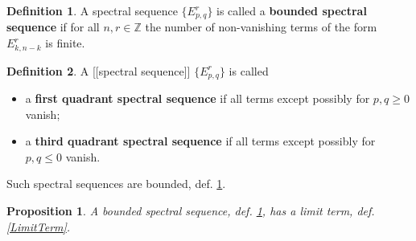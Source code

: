 \documentclass[12pt,titlepage]{article}
\theoremstyle{plain}
\newtheorem{prop}{Proposition}
\theoremstyle{definition}
\newtheorem{defn}{Definition}
\theoremstyle{remark}
\begin{document}
\begin{defn}
\label{BoundedSpectralSequence}\hypertarget{BoundedSpectralSequence}{}
A spectral sequence $\{E^r_{p,q}\}$ is called a \textbf{bounded spectral sequence} if for all $n,r \in \mathbb{Z}$ the number of non-vanishing terms of the form $E^r_{k,n-k}$ is finite.

\end{defn}
\begin{defn}
\label{QuadrantSpectralSequence}\hypertarget{QuadrantSpectralSequence}{}
A [[spectral sequence]] $\{E^r_{p,q}\}$ is called

\begin{itemize}%
\item a \textbf{first quadrant spectral sequence} if all terms except possibly for $p,q \geq 0$ vanish;


\item a \textbf{third quadrant spectral sequence} if all terms except possibly for $p,q \leq 0$ vanish.



\end{itemize}
Such spectral sequences are bounded, def. \ref{BoundedSpectralSequence}.

\end{defn}
\begin{prop}
\label{BoundedSpectralSequenceHasLimitTerm}\hypertarget{BoundedSpectralSequenceHasLimitTerm}{}
A bounded spectral sequence, def. \ref{BoundedSpectralSequence}, has a limit term, def. \ref{LimitTerm}.

\end{prop}
\end{document}
